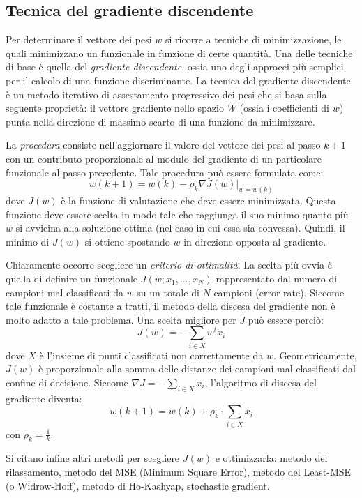 \documentclass[a4paper,oneside,titlepage]{book}
\begin{document}
\subsection{Tecnica del gradiente discendente}
Per determinare il vettore dei pesi $w$ si ricorre a tecniche di minimizzazione, le quali minimizzano un funzionale in funzione di certe quantità. Una delle tecniche di base è quella del \textit{gradiente discendente}, ossia uno degli approcci più semplici per il calcolo di una funzione discriminante. La tecnica del gradiente discendente è un metodo iterativo di assestamento progressivo dei pesi che si basa sulla seguente proprietà: il vettore gradiente nello spazio $W$ (ossia i coefficienti di $w$) punta nella direzione di massimo scarto di una funzione da minimizzare.

La \textit{procedura} consiste nell'aggiornare il valore del vettore dei pesi al passo $k+1$ con un contributo proporzionale al modulo del gradiente di un particolare funzionale al passo precedente. Tale procedura può essere formulata come:
\[ w(k+1) = w(k) - \rho_k \nabla J(w) |_{w=w(k)} \]
dove $J(w)$ è la funzione di valutazione che deve essere minimizzata. Questa funzione deve essere scelta in modo tale che raggiunga il suo minimo quanto più $w$ si avvicina alla soluzione ottima (nel caso in cui essa sia convessa). Quindi, il minimo di $J(w)$ si ottiene spostando $w$ in direzione opposta al gradiente.

Chiaramente occorre scegliere un \textit{criterio di ottimalità}. La scelta più ovvia è quella di definire un funzionale $J(w;x_1,...,x_N)$ rappresentato dal numero di campioni mal classificati da $w$ su un totale di $N$ campioni (error rate). Siccome tale funzionale è costante a tratti, il metodo della discesa del gradiente non è molto adatto a tale problema. Una scelta migliore per $J$ può essere perciò:
\[ J(w) = - \sum_{i \in X} w^t x_i \]
dove $X$ è l'insieme di punti classificati non correttamente da $w$. Geometricamente, $J(w)$ è proporzionale alla somma delle distanze dei campioni mal classificati dal confine di decisione. Siccome $\nabla J = - \sum_{i \in X} x_i$, l'algoritmo di discesa del gradiente diventa:
\[ w(k+1) = w(k) + \rho_k \cdot \sum_{i \in X} x_i \]
con $\rho_k = \frac{1}{k}$.

Si citano infine altri metodi per scegliere $J(w)$ e ottimizzarla: metodo del rilassamento, metodo del MSE (Minimum Square Error), metodo del Least-MSE (o Widrow-Hoff), metodo di Ho-Kashyap, stochastic gradient.
\end{document}
